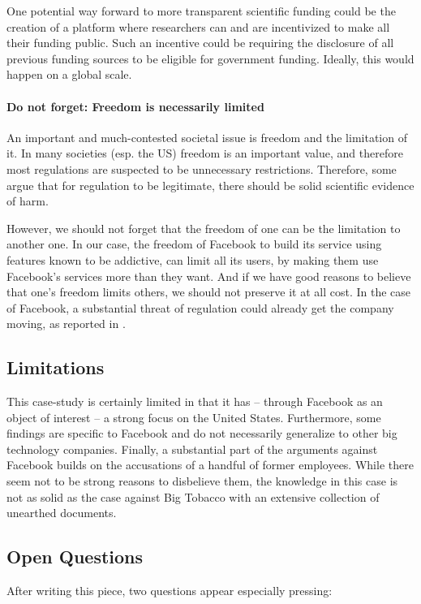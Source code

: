 One potential way forward to more transparent scientific funding could be the creation of a platform where researchers can and are incentivized to make all their funding public. Such an incentive could be requiring the disclosure of all previous funding sources to be eligible for government funding.
Ideally, this would happen on a global scale.

\paragraph{Do not forget: Freedom is necessarily limited} An important and much-contested societal issue is freedom and the limitation of it. 
In many societies (esp. the US) freedom is an important value, and therefore most regulations are suspected to be unnecessary restrictions. 
Therefore, some argue that for regulation to be legitimate, there should be solid scientific evidence of harm. 

However, we should not forget that the freedom of one can be the limitation to another one. 
In our case, the freedom of Facebook to build its service using features known to be addictive, can limit all its users, by making them use Facebook's services more than they want.
And if we have good reasons to believe that one's freedom limits others, we should not preserve it at all cost.
In the case of Facebook, a substantial threat of regulation could already get the company moving, as reported in \citep{frier_ugly_2021}.

\subsection{Limitations}
This case-study is certainly limited in that it has -- through Facebook as an object of interest -- a strong focus on the United States. 
Furthermore, some findings are specific to Facebook and do not necessarily generalize to other big technology companies. 
Finally, a substantial part of the arguments against Facebook builds on the accusations of a handful of former employees.
While there seem not to be strong reasons to disbelieve them, the knowledge in this case is not as solid as the case against Big Tobacco with an extensive collection of unearthed documents.

\subsection{Open Questions}
After writing this piece, two questions appear especially pressing:


